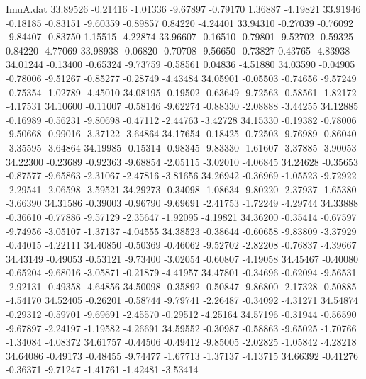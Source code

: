\begin{filecontents}{ImuA.dat}
  33.89526   -0.21416   -1.01336   -9.67897   -0.79170    1.36887   -4.19821
  33.91946   -0.18185   -0.83151   -9.60359   -0.89857    0.84220   -4.24401
  33.94310   -0.27039   -0.76092   -9.84407   -0.83750    1.15515   -4.22874
  33.96607   -0.16510   -0.79801   -9.52702   -0.59325    0.84220   -4.77069
  33.98938   -0.06820   -0.70708   -9.56650   -0.73827    0.43765   -4.83938
  34.01244   -0.13400   -0.65324   -9.73759   -0.58561    0.04836   -4.51880
  34.03590   -0.04905   -0.78006   -9.51267   -0.85277   -0.28749   -4.43484
  34.05901   -0.05503   -0.74656   -9.57249   -0.75354   -1.02789   -4.45010
  34.08195   -0.19502   -0.63649   -9.72563   -0.58561   -1.82172   -4.17531
  34.10600   -0.11007   -0.58146   -9.62274   -0.88330   -2.08888   -3.44255
  34.12885   -0.16989   -0.56231   -9.80698   -0.47112   -2.44763   -3.42728
  34.15330   -0.19382   -0.78006   -9.50668   -0.99016   -3.37122   -3.64864
  34.17654   -0.18425   -0.72503   -9.76989   -0.86040   -3.35595   -3.64864
  34.19985   -0.15314   -0.98345   -9.83330   -1.61607   -3.37885   -3.90053
  34.22300   -0.23689   -0.92363   -9.68854   -2.05115   -3.02010   -4.06845
  34.24628   -0.35653   -0.87577   -9.65863   -2.31067   -2.47816   -3.81656
  34.26942   -0.36969   -1.05523   -9.72922   -2.29541   -2.06598   -3.59521
  34.29273   -0.34098   -1.08634   -9.80220   -2.37937   -1.65380   -3.66390
  34.31586   -0.39003   -0.96790   -9.69691   -2.41753   -1.72249   -4.29744
  34.33888   -0.36610   -0.77886   -9.57129   -2.35647   -1.92095   -4.19821
  34.36200   -0.35414   -0.67597   -9.74956   -3.05107   -1.37137   -4.04555
  34.38523   -0.38644   -0.60658   -9.83809   -3.37929   -0.44015   -4.22111
  34.40850   -0.50369   -0.46062   -9.52702   -2.82208   -0.76837   -4.39667
  34.43149   -0.49053   -0.53121   -9.73400   -3.02054   -0.60807   -4.19058
  34.45467   -0.40080   -0.65204   -9.68016   -3.05871   -0.21879   -4.41957
  34.47801   -0.34696   -0.62094   -9.56531   -2.92131   -0.49358   -4.64856
  34.50098   -0.35892   -0.50847   -9.86800   -2.17328   -0.50885   -4.54170
  34.52405   -0.26201   -0.58744   -9.79741   -2.26487   -0.34092   -4.31271
  34.54874   -0.29312   -0.59701   -9.69691   -2.45570   -0.29512   -4.25164
  34.57196   -0.31944   -0.56590   -9.67897   -2.24197   -1.19582   -4.26691
  34.59552   -0.30987   -0.58863   -9.65025   -1.70766   -1.34084   -4.08372
  34.61757   -0.44506   -0.49412   -9.85005   -2.02825   -1.05842   -4.28218
  34.64086   -0.49173   -0.48455   -9.74477   -1.67713   -1.37137   -4.13715
  34.66392   -0.41276   -0.36371   -9.71247   -1.41761   -1.42481   -3.53414

\end{filecontents}
